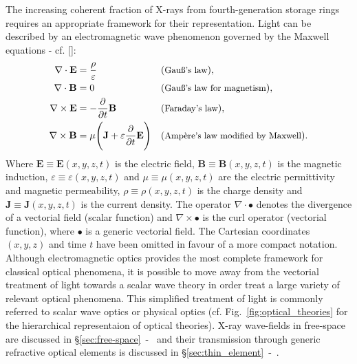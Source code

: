 \begin{refsection}
The increasing coherent fraction of X-rays from fourth-generation storage rings requires
an appropriate framework for their representation. Light can be described by an electromagnetic wave phenomenon governed by the Maxwell equations - cf. [\cite[\textit{§1.1}]{born_wolf1999}]:
\begin{subequations}\label{eq:Maxwell}
    \begin{align}
        \nabla\cdot\textbf{E} &= \frac{\rho}{\varepsilon}
                                       &&(\small{\text{Gau{\ss}'s~law}}),\\
        \nabla\cdot\textbf{B} &= 0 
                                       &&(\small{\text{Gau{\ss}'s law for magnetism}}),\\
        \nabla\times\textbf{E} &= -\frac{\partial}{\partial t}\textbf{B}
                                        &&(\small{\text{Faraday's law}}),\\
        \nabla\times\textbf{B} &= \mu\Bigg(\textbf{J}+\varepsilon\frac{\partial}{\partial t}\textbf{E}\Bigg)
                                       &&(\small{\text{Ampère's law modified by Maxwell}}).
    \end{align}
\end{subequations}{}
Where $\textbf{E}\equiv\textbf{E}(x,y,z,t)$ is the electric field, $\textbf{B}\equiv\textbf{B}(x,y,z,t)$ is the magnetic induction, $\varepsilon\equiv\varepsilon(x,y,z,t)$ and $\mu\equiv\mu(x,y,z,t)$ are the electric permittivity and magnetic permeability, $\rho\equiv\rho(x,y,z,t)$ is the charge density and $\textbf{J}\equiv\textbf{J}(x,y,z,t)$ is the current density. The operator $\nabla\cdot\bullet$ denotes the divergence of a vectorial field (scalar function) and $\nabla\times\bullet$ is the curl operator (vectorial function), where $\bullet$ is a generic vectorial field. The Cartesian coordinates $(x,y,z)$ and time $t$ have been omitted in favour of a more compact notation. Although electromagnetic optics provides the most complete framework for classical optical phenomena, it is possible to move away from the vectorial treatment of light towards a scalar wave theory in order treat a large variety of relevant optical phenomena. This simplified treatment of light is commonly referred to scalar wave optics or physical optics (cf. Fig.~\ref{fig:optical_theories} for the hierarchical representaion of optical theories). X-ray wave-fields in free-space are discussed in §\ref{sec:free-space}~-~\textit{} and their transmission through generic refractive optical elements is discussed in §\ref{sec:thin_element}~-~\textit{}.


\end{refsection}
